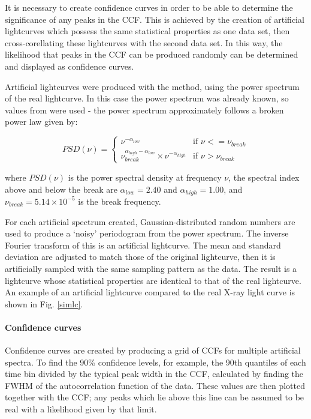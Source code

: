 \documentclass[letters,useAMS,usenatbib]{samnote}
\begin{document}
It is necessary to create confidence curves in order to be able to determine the significance of any peaks in the CCF. This is achieved by the creation of
artificial lightcurves which possess the same statistical properties as one data set, then cross-corellating these lightcurves with the second data set. In this way, the
likelihood that peaks in the CCF can be produced randomly can be determined and displayed as confidence curves.

Artificial lightcurves were produced with the \citet{timmer&koenig} method, using the power spectrum of the real lightcurve. In this case the
power spectrum was already known, so values from \citet{uttley} were used - the power spectrum approximately follows a broken power law given by: 


\begin{equation}
PSD(\nu) =
\begin{cases}
\nu^{-\alpha_{low}} & \text{if } \nu <= \nu_{break}
\\
\nu_{break}^{\alpha_{high}-\alpha_{low}}\times \nu^{-\alpha_{high}}  & \text{if } \nu > \nu_{break}
\end{cases}
\end{equation}
\hspace{2cm}

\noindent where $PSD(\nu)$ is the power spectral density at frequency $\nu$, the spectral index above and below the break are $\alpha_{low}  = 2.40$ and $\alpha_{high} =
1.00$, and $\nu_{break} = 5.14\times10^{-5}$ is the break frequency.

For each artificial spectrum created, Gaussian-distributed random numbers are used to produce a `noisy' periodogram from the power spectrum. The inverse Fourier transform
of this is an artificial lightcurve. The mean and standard deviation are adjusted to match those of the original lightcurve, then it is artificially sampled with the same
sampling pattern as the data. The result is a lightcurve whose statistical properties are identical to that of the real lightcurve. An example of an artificial lightcurve
compared to the real X-ray light curve is shown in Fig. \ref{simlc}.


 
\paragraph{Confidence curves}

Confidence curves are created by producing a grid of CCFs for multiple artificial spectra. To find the 90\% confidence levels, for example, the 90th quantiles of each
time bin divided by the typical peak width in the CCF, calculated by finding the FWHM of the autocorrelation function of the data. These values are then plotted together
with the CCF; any peaks which lie above this line can be assumed to be real with a likelihood given by that limit.
 
\end{document}
